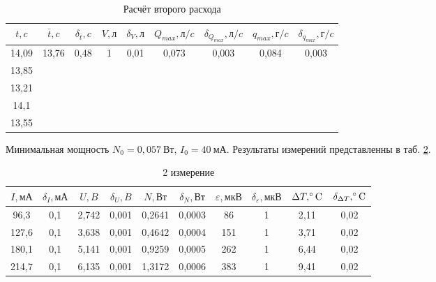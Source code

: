 \documentclass[a4paper, 12pt]{article}
\begin{document}
\begin{table}[h!]
\begin{center}
\begin{tabular}{|c|c|c|c|c|c|c|c|c|}
\hline
$t, c$ & $\overline{t}, c$     & $\delta_{\overline{t}}, c$ & $V, л$             & $\delta_V, л$         & $Q_{max}, л/c$               & $\delta_{Q_{max}}, л/c$        & $q_{max}, г/c$               & $\delta_{q_{max}}, г/c$ \\ \hline
14,09 & \multirow{5}{*}{13,76} & \multirow{5}{*}{0,48} & \multirow{5}{*}{1} & \multirow{5}{*}{0,01} & \multirow{5}{*}{0,073} & \multirow{5}{*}{0,003} & \multirow{5}{*}{0,084} & \multirow{5}{*}{0,003} \\ \cline{1-1}
13,85 &                        &                       &                    &                       &                        &                        &                        &                        \\ \cline{1-1}
13,21 &                        &                       &                    &                       &                        &                        &                        &                        \\ \cline{1-1}
14,1  &                        &                       &                    &                       &                        &                        &                        &                        \\ \cline{1-1}
13,55 &                        &                       &                    &                       &                        &                        &                        &                        \\ \hline
\end{tabular}
\end{center}
\caption{Расчёт второго расхода}
\label{tab3}
\end{table}

Минимальная мощность $N_0 = 0,057~Вт$, $I_0 = 40~мА$. Результаты измерений представленны в таб. \ref{tab4}.

\newpage
\begin{table}[h!]
\begin{center}
\begin{tabular}{|c|c|c|c|c|c|c|c|c|c|}
\hline
$I, мА$ & $\delta_{I}, мА$ & $U, B$ & $\delta_{U}, B$ & $N, Вт$ & $\delta_{N}, Вт$ & $\varepsilon, мкВ$ & $\delta_{\varepsilon}, мкВ$ & $\Delta{T}, \celsius$ & $\delta_{\Delta{T}}, \celsius$ \\ \hline
96,3  & 0,1 & 2,742 & 0,001 & 0,2641 & 0,0003 & 86  & 1 & 2,11 & 0,02 \\ \hline
127,6 & 0,1 & 3,638 & 0,001 & 0,4642 & 0,0004 & 151 & 1 & 3,71 & 0,02 \\ \hline
180,1 & 0,1 & 5,141 & 0,001 & 0,9259 & 0,0005 & 262 & 1 & 6,44 & 0,02 \\ \hline
214,7 & 0,1 & 6,135 & 0,001 & 1,3172 & 0,0006 & 383 & 1 & 9,41 & 0,02 \\ \hline
\end{tabular}
\caption{2 измерение}
\label{tab4}
\end{center}
\end{table}
\end{document}
